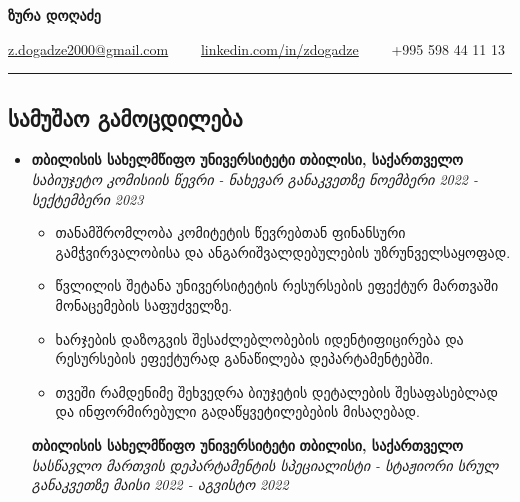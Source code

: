 \documentclass[10pt,letterpaper]{article}
\begin{document}
 
\begin{center}
{\huge \textbf{ზურა დოღაძე}}


\vspace{1em}

\href{mailto:z.dogadze2000@gmail.com}{z.dogadze2000@gmail.com} 
\ \ \textbullet \ \ 
\href{https://www.linkedin.com/in/zdogadze/}{linkedin.com/in/zdogadze}
\ \ \textbullet \ \ 
+995 598 44 11 13\end{center}


\hrule
\vspace{-1.0em}
\subsection*{სამუშაო გამოცდილება}
  \begin{itemize}
    \item[]

    {\textbf{თბილისის სახელმწიფო უნივერსიტეტი} \hfill
    \textbf{თბილისი, საქართველო}}
  \\
  {\emph{საბიუჯეტო კომისიის წევრი - ნახევარ განაკვეთზე} \hfill \emph{ნოემბერი 2022 - სექტემბერი 2023}}

  \begin{itemize}[label=\textbullet]
  \itemsep0.5em
  \item თანამშრომლობა კომიტეტის წევრებთან ფინანსური გამჭვირვალობისა და ანგარიშვალდებულების უზრუნველსაყოფად.
  \item წვლილის შეტანა უნივერსიტეტის რესურსების ეფექტურ მართვაში მონაცემების საფუძველზე.
  \item ხარჯების დაზოგვის შესაძლებლობების იდენტიფიცირება და რესურსების ეფექტურად განაწილება დეპარტამენტებში.
  \item თვეში რამდენიმე შეხვედრა ბიუჯეტის დეტალების შესაფასებლად და ინფორმირებული გადაწყვეტილებების მისაღებად.

  \end{itemize}


   {\textbf{თბილისის სახელმწიფო უნივერსიტეტი} \hfill
      \textbf{თბილისი, საქართველო}}
    \\
    {\emph{სასწავლო მართვის დეპარტამენტის სპეციალისტი - სტაჟიორი სრულ განაკვეთზე} \hfill \emph{მაისი 2022 - აგვისტო 2022}}


\end{itemize}
\end{document}
